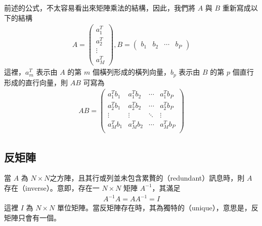 \documentclass[letterpaper,10pt,english]{sphinxmanual}
\begin{document}
前述的公式，不太容易看出來矩陣乘法的結構，因此，我們將 \(A\) 與 \(B\) 重新寫成以下的結構
\begin{equation*}
\begin{split}
A =
\begin{pmatrix}
  a_1^T \\
  a_2^T  \\
  \vdots \\
  a_{M}^T
 \end{pmatrix},
 B =
\begin{pmatrix}
  b_1 & b_2  & \cdots & b_{P}
 \end{pmatrix}
\end{split}
\end{equation*}
這裡，\(a_m^T\) 表示由 \(A\) 的第 \(m\) 個橫列形成的橫列向量，\(b_p\) 表示由 \(B\) 的第 \(p\) 個直行形成的直行向量，則 \(AB\) 可寫為
\begin{equation*}
\begin{split}
AB =
  \begin{pmatrix}
  a_1^T b_1 & a_1^T b_2 & \cdots & a_1^T b_P \\
  a_2^T b_1 & a_2^T b_2 & \cdots & a_2^T b_P \\
  \vdots  & \vdots  & \ddots & \vdots  \\
  a_M^T b_1 & a_M^T b_2 & \cdots & a_M^T b_P \\
 \end{pmatrix}
\end{split}
\end{equation*}

\subsection{反矩陣}
\label{\detokenize{notebook/mathematics-prerequisite:id9}}
當 \(A\) 為 \(N \times N\)之方陣，且其行或列並未包含累贅的（redundant）訊息時，則 \(A\) 存在（inverse）。意即，存在一 \(N \times N\) 矩陣 \(A^{-1}\)，其滿足
\begin{equation*}
\begin{split}
A^{-1} A = A A^{-1} = I
\end{split}
\end{equation*}
這裡 \(I\) 為 \(N \times N\) 單位矩陣。當反矩陣存在時，其為獨特的（unique），意思是，反矩陣只會有一個。
\end{document}
